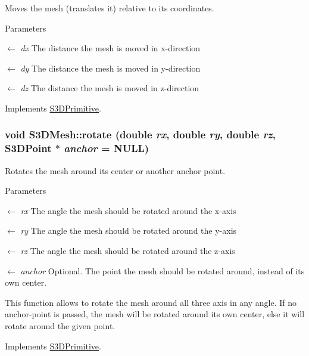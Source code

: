 Moves the mesh (translates it) relative to its coordinates. 


\begin{DoxyParams}{Parameters}
\item[\mbox{$\leftarrow$} {\em dx}]The distance the mesh is moved in x-\/direction \item[\mbox{$\leftarrow$} {\em dy}]The distance the mesh is moved in y-\/direction \item[\mbox{$\leftarrow$} {\em dz}]The distance the mesh is moved in z-\/direction \end{DoxyParams}


Implements \hyperlink{class_s3_d_primitive_a73a178ec2e1aa8e95f01baf0552724a9}{S3DPrimitive}.

\hypertarget{class_s3_d_mesh_affff1ac3ef33b293a9ec9881a4e13993}{
\subsubsection[{rotate}]{\setlength{\rightskip}{0pt plus 5cm}void S3DMesh::rotate (double {\em rx}, \/  double {\em ry}, \/  double {\em rz}, \/  {\bf S3DPoint} $\ast$ {\em anchor} = {\ttfamily NULL})}}
\label{class_s3_d_mesh_affff1ac3ef33b293a9ec9881a4e13993}


Rotates the mesh around its center or another anchor point. 


\begin{DoxyParams}{Parameters}
\item[\mbox{$\leftarrow$} {\em rx}]The angle the mesh should be rotated around the x-\/axis \item[\mbox{$\leftarrow$} {\em ry}]The angle the mesh should be rotated around the y-\/axis \item[\mbox{$\leftarrow$} {\em rz}]The angle the mesh should be rotated around the z-\/axis \item[\mbox{$\leftarrow$} {\em anchor}]Optional. The point the mesh should be rotated around, instead of its own center.\end{DoxyParams}
This function allows to rotate the mesh around all three axis in any angle. If no anchor-\/point is passed, the mesh will be rotated around its own center, else it will rotate around the given point. 

Implements \hyperlink{class_s3_d_primitive_a23eb36b6bd48643e8f7be4b950592d9e}{S3DPrimitive}.


